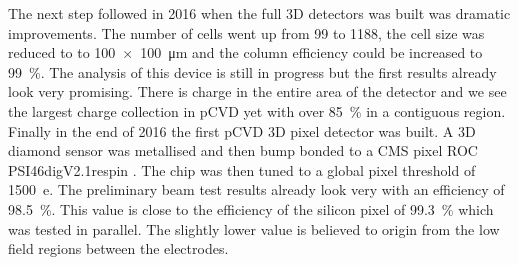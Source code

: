 The next step followed in 2016 when the full 3D detectors was built was dramatic improvements. The number of cells went up from 99 to 1188, the cell size was reduced to to \SI{100x100}{\micro\meter} and the column efficiency could be increased to \SI{99}{\%}. The analysis of this device is still in progress but the first results already look very promising. There is charge in the entire area of the detector and we see the largest charge collection in \ac{pCVD} yet with over \SI{85}{\%} in a contiguous region.\\
Finally in the end of 2016 the first \ac{pCVD} 3D pixel detector was built. A 3D diamond sensor was metallised and then bump bonded to a CMS pixel \ac{ROC} PSI46digV2.1respin \cite{kornmayer}. The chip was then tuned to a global pixel threshold of \SI{1500}{e}. The preliminary beam test results already look very with an efficiency of \SI{98.5}{\%}. This value is close to the efficiency of the silicon pixel of \SI{99.3}{\%} which was tested in parallel. The slightly lower value is believed to origin from the low field regions between the electrodes.